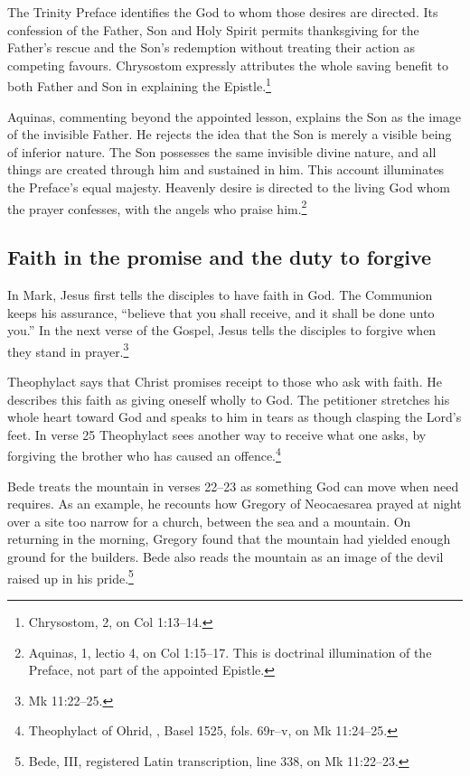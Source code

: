 The Trinity Preface identifies the God
to whom those desires are directed.
Its confession of the Father, Son and
Holy Spirit permits thanksgiving for
the Father's rescue and the Son's
redemption without treating their
action as competing favours.
Chrysostom expressly attributes the
whole saving benefit to both Father
and Son in explaining the
Epistle.\footnote{Chrysostom,
 2,
on Col 1:13--14.}

Aquinas, commenting beyond the appointed
lesson, explains the Son as the image
of the invisible Father. He rejects
the idea that the Son is merely a
visible being of inferior nature.
The Son possesses the same invisible
divine nature, and all things are
created through him and sustained in
him. This account illuminates the
Preface's equal majesty. Heavenly
desire is directed to the living
God whom the prayer confesses,
with the angels who praise
him.\footnote{Aquinas,
 1, lectio 4,
on Col 1:15--17. This is doctrinal
illumination of the Preface, not
part of the appointed Epistle.}

\subsection{Faith in the promise and the duty to forgive}

In Mark, Jesus first tells the disciples to have faith in God.
The Communion keeps his assurance, ``believe that you shall receive,
and it shall be done unto you.'' In the next verse of the Gospel,
Jesus tells the disciples to forgive when they stand in
prayer.\footnote{Mk 11:22--25.}

Theophylact says that Christ promises receipt to those who ask
with faith. He describes this faith as giving oneself wholly
to God. The petitioner stretches his whole heart toward God
and speaks to him in tears as though clasping the Lord's feet.
In verse 25 Theophylact sees another way to receive what one asks,
by forgiving the brother who has caused an offence.\footnote{Theophylact
of Ohrid, ,
Basel 1525, fols. 69r--v,
on Mk 11:24--25.}

Bede treats the mountain in verses 22--23 as something God can
move when need requires. As an example, he recounts how Gregory
of Neocaesarea prayed at night over a site too narrow for a church,
between the sea and a mountain. On returning in the morning,
Gregory found that the mountain had yielded enough ground for the
builders. Bede also reads the mountain as an image of the devil
raised up in his pride.\footnote{Bede,
III, registered Latin transcription, line 338, on Mk 11:22--23.}

